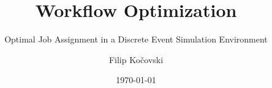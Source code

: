 \documentclass{seal_thesis}
\date{\today}
\title{Workflow Optimization}
\subtitle{Optimal Job Assignment in a Discrete Event Simulation Environment}
\author{Filip Ko\v{c}ovski}
\begin{document}
\maketitle

\frontmatter



\glsresetall



\glsresetall



\tableofcontents

\listoffigures

\listoftables

\mainmatter

\glsresetall



\glsresetall



\glsresetall



\glsresetall



\glsresetall



\glsresetall



\glsresetall



\appendix

\glsresetall



\glsresetall



\glsresetall



\glsresetall



\backmatter




\printglossaries
\end{document}
